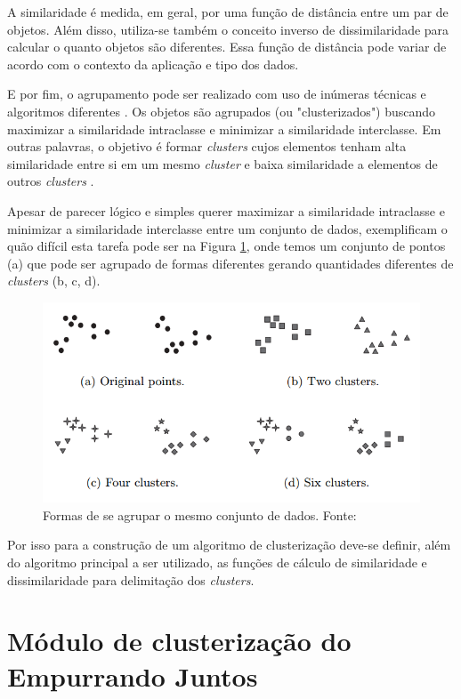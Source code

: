 A similaridade é medida, em geral, por uma função de distância entre um par de objetos. Além disso, utiliza-se também
o conceito inverso de dissimilaridade para calcular o quanto objetos são diferentes. Essa função de distância pode variar de acordo 
com o contexto da aplicação e tipo dos dados. 

E por fim, o agrupamento pode ser realizado com uso de inúmeras técnicas e algoritmos diferentes \cite{clustering_review}.
Os objetos são agrupados (ou "clusterizados") buscando maximizar a similaridade intraclasse e minimizar a similaridade interclasse.
Em outras palavras, o objetivo é formar \textit{clusters} cujos elementos tenham alta similaridade entre si em um mesmo \textit{cluster} 
e baixa similaridade a elementos de outros \textit{clusters} \cite{han2011data}.

Apesar de parecer lógico e simples querer maximizar a similaridade intraclasse e minimizar a similaridade interclasse entre um conjunto de dados, 
 exemplificam o quão difícil esta tarefa pode ser na Figura \ref{fig:clusters_difficulty}, onde temos um conjunto
de pontos (a) que pode ser agrupado de formas diferentes gerando quantidades diferentes de \textit{clusters} (b, c, d).

\begin{figure}[ht!]
\centering
\includegraphics[scale=0.4]{figuras/clusters_difficulty.png}
\caption{Formas de se agrupar o mesmo conjunto de dados. Fonte: \cite{tan2013data}}
\label{fig:clusters_difficulty}
\end{figure}

Por isso para a construção de um algoritmo de clusterização deve-se definir, além do algoritmo principal a ser utilizado, as funções
de cálculo de similaridade e dissimilaridade para delimitação dos \textit{clusters}.

\section{Módulo de clusterização do Empurrando Juntos}

